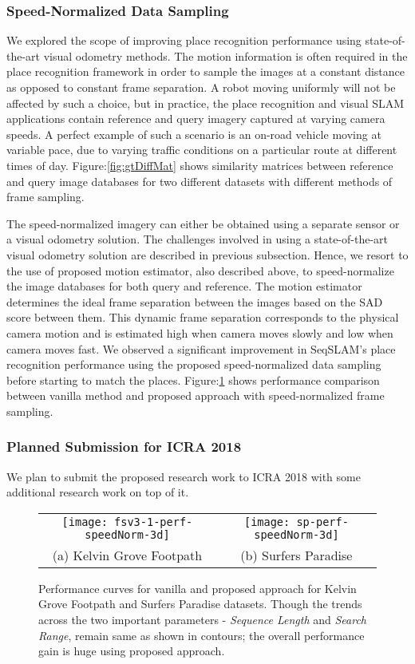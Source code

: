 \documentclass{article}
\begin{document}
\subsubsection{Speed-Normalized Data Sampling}
We explored the scope of improving place recognition performance using state-of-the-art visual odometry methods. The motion information is often required in the place recognition framework in order to sample the images at a constant distance as opposed to constant frame separation. A robot moving uniformly will not be affected by such a choice, but in practice, the place recognition and visual SLAM applications contain reference and query imagery captured at varying camera speeds. A perfect example of such a scenario is an on-road vehicle moving at variable pace, due to varying traffic conditions on a particular route at different times of day. Figure:\ref{fig:gtDiffMat} shows similarity matrices between reference and query image databases for two different datasets with different methods of frame sampling.

The speed-normalized imagery can either be obtained using a separate sensor or a visual odometry solution. The challenges involved in using a state-of-the-art visual odometry solution are described in previous subsection. Hence, we resort to the use of proposed motion estimator, also described above, to speed-normalize the image databases for both query and reference. The motion estimator determines the ideal frame separation between the images based on the SAD score between them. This dynamic frame separation corresponds to the physical camera motion and is estimated high when camera moves slowly and low when camera moves fast. We observed a significant improvement in SeqSLAM's place recognition performance using the proposed speed-normalized data sampling before starting to match the places. Figure:\ref{fig:perfSpeedNorm} shows performance comparison between vanilla method and proposed approach with speed-normalized frame sampling.

\subsubsection{Planned Submission for ICRA 2018}
We plan to submit the proposed research work to ICRA 2018 with some additional research work on top of it.

\begin{figure}
\centering
\begin{tabular}{cc}
\hspace{-1cm}
	\texttt{[image: fsv3-1-perf-speedNorm-3d]}&
	\texttt{[image: sp-perf-speedNorm-3d]}\\
	(a) Kelvin Grove Footpath & (b) Surfers Paradise \\	
\end{tabular}
	\caption{Performance curves for vanilla and proposed approach for Kelvin Grove Footpath and Surfers Paradise datasets. Though the trends across the two important parameters - \emph{Sequence Length} and \emph{Search Range}, remain same as shown in contours; the overall performance gain is huge using proposed approach.}
	\label{fig:perfSpeedNorm}
\end{figure}
\end{document}

